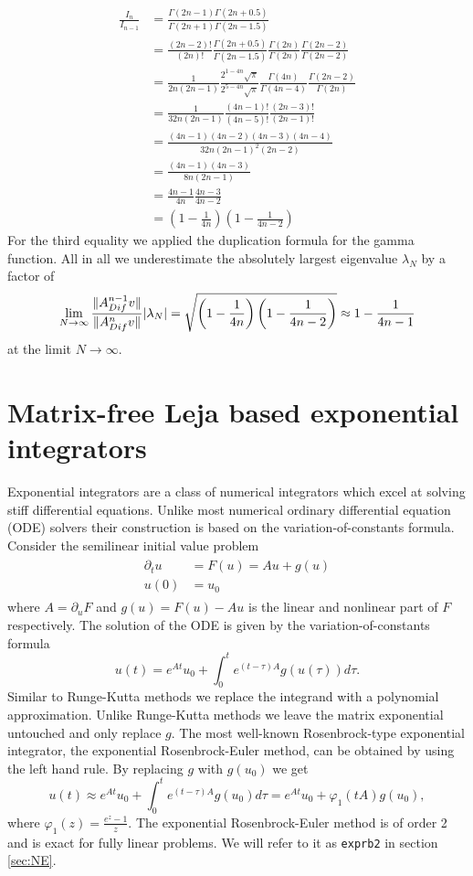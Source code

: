 \documentclass{scrartcl}
\begin{document}
	\begin{align*}
	\frac{I_n}{I_{n-1}} &= 
	\frac{\Gamma(2n - 1)\Gamma(2n + 0.5)}{\Gamma(2n + 1)\Gamma(2n - 1.5)} \\&=   
	\frac{(2n - 2)!}{(2n)!}
	\frac{\Gamma(2n + 0.5)}{\Gamma(2n - 1.5)}
	\frac{\Gamma(2n)}{\Gamma(2n)}
	\frac{\Gamma(2n-2)}{\Gamma(2n-2)} \\&=
	\frac{1}{2n(2n-1)} 
	\frac{2^{1-4n}\sqrt\pi}{2^{5-4n}\sqrt\pi}
	\frac{\Gamma(4n)}{\Gamma(4n-4)}
	\frac{\Gamma(2n-2)}{\Gamma(2n)} \\&=
	\frac{1}{32n(2n-1)} 
	\frac{(4n-1)!}{(4n-5)!}
	\frac{(2n-3)!}{(2n-1)!} \\&=
	\frac{(4n-1)(4n-2)(4n-3)(4n-4)}{32n(2n-1)^2(2n-2)} \\&=
	\frac{(4n-1)(4n-3)}{8n(2n-1)} \\&=
	\frac{4n-1}{4n}\frac{4n-3}{4n-2} \\&=
	\left(1-\frac{1}{4n}\right)\left(1-\frac{1}{4n-2}\right)
	\end{align*}
	For the third equality we applied the duplication formula for the gamma function. All in all we underestimate the absolutely largest eigenvalue $\lambda_N$ by a factor of 
	\[
	\lim_{N\to\infty}\frac{\lVert A_{Dif}^{n-1}v\rVert}{\lVert A_{Dif}^{n}v\rVert}\lvert\lambda_N\rvert =
	\sqrt{\left(1-\frac{1}{4n}\right)\left(1-\frac{1}{4n-2}\right)} \approx
	1-\frac{1}{4n-1}
	\]
	at the limit $N\to\infty$. 
	
	\section{Matrix-free Leja based exponential integrators}
	Exponential integrators are a class of numerical integrators which excel at solving stiff differential equations. Unlike most numerical ordinary differential equation (ODE) solvers their construction is based on the variation-of-constants formula. Consider the semilinear initial value problem
	\begin{align}
	\begin{split}
	\partial_tu &= F(u) = Au + g(u) \\ 
	u(0) &= u_0
	\end{split}\label{semilinear}
	\end{align}
	where $A = \partial_uF$ and $g(u) = F(u)-Au$ is the linear and nonlinear part of $F$ respectively. The solution of the ODE is given by the variation-of-constants formula
	\[
	u(t) = e^{At}u_0 + \int_{0}^{t}e^{(t-\tau)A}g(u(\tau))d\tau.
	\]
	Similar to Runge-Kutta methods we replace the integrand with a polynomial approximation. Unlike Runge-Kutta methods we leave the matrix exponential untouched and only replace $g$. The most well-known Rosenbrock-type exponential integrator, the exponential Rosenbrock-Euler method, can be obtained by using the left hand rule. By replacing $g$ with $g(u_0)$ we get
	\[
	u(t) \approx e^{At}u_0 + \int_{0}^{t}e^{(t-\tau)A}g(u_0)d\tau = e^{At}u_0 + \varphi_1(tA)g(u_0),
	\]
	where $\varphi_1(z) = \frac{e^z-1}z$. The exponential Rosenbrock-Euler method is of order 2 and is exact for fully linear problems. We will refer to it as \texttt{exprb2} in section \ref{sec:NE}.
\end{document}
